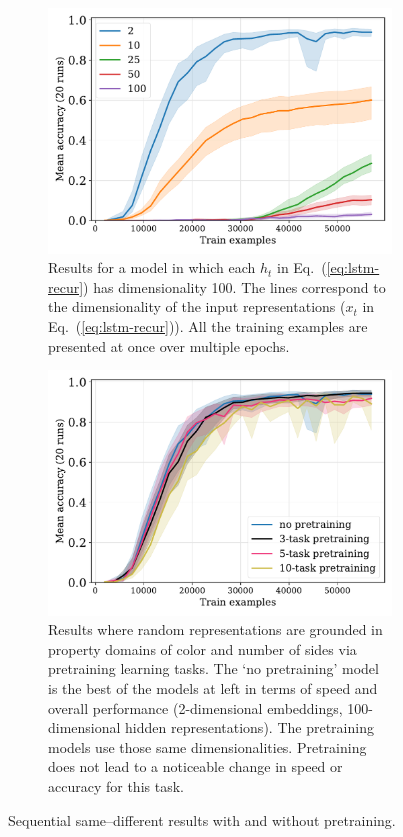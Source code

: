 \documentclass[9pt,twocolumn,twoside,lineno]{pnas-new}
\newcommand{\eg}[1]{(\ref{#1})}
\newcommand{\update}[1]{{\color{darkblue}#1}}
\begin{document}
\begin{figure}[tp]
\centering
\begin{subfigure}[t]{0.48\textwidth}
  \centering
  \includegraphics[width=1\linewidth]{../fig/fuzzy-lm-vocab20-train_size-embed_dim-hidden_dim=100.pdf}
  \caption{Results for a model in which each $h_{t}$ in Eq.~\eg{eq:lstm-recur} has dimensionality 100. The lines correspond to the dimensionality of the input representations ($x_t$ in Eq.~\eg{eq:lstm-recur}). All the training examples are presented at once over multiple epochs.}
  \label{fig:fuzzy-lm-results}
\end{subfigure}
\hfill
\begin{subfigure}[t]{0.48\textwidth}
  \centering
  \includegraphics[width=1\linewidth]{../fig/fuzzy-lm-pretrain-compare-train_size-pretrained-embed_dim=None.pdf}
  \caption{\update{Results where random representations are grounded in property domains of color and number of sides via pretraining learning tasks.  The `no pretraining' model is the best of the models at left in terms of speed and overall performance (2-dimensional embeddings, 100-dimensional hidden representations). The pretraining models use those same dimensionalities. Pretraining does not lead to a noticeable change in speed or accuracy for this task.}}
  \label{fig:fuzzy-lm-pretrain-results}
\end{subfigure}
\caption{Sequential same--different results with and without pretraining.}
\end{figure}
\end{document}

